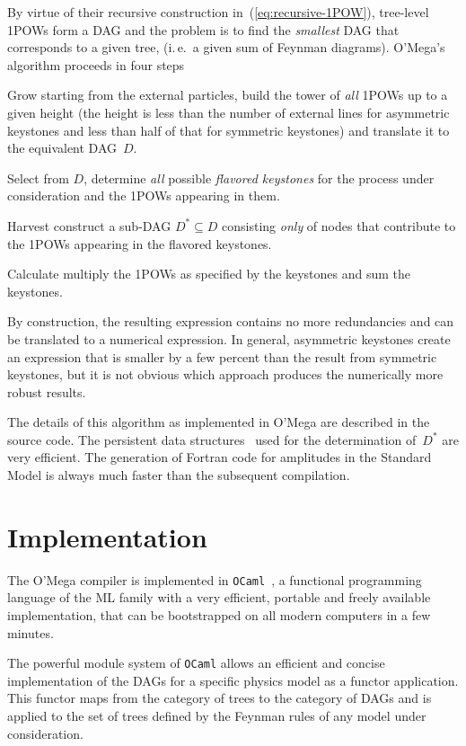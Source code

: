 \documentclass[12pt,a4paper]{article}
\newenvironment{algorithm}[1]%
 {\begin{list}{}%
   {\setlength{\leftmargin}{3em}%
    \setlength{\rightmargin}{3em}%
    \setlength{\itemindent}{1em}%
    \setlength{\listparindent}{0pt}%
    \settowidth{\labelwidth}{5em}%
    \renewcommand{\makelabel}[1]{\textbf{\hss##1:}}}}%
 {\end{list}}
\def\OCaml/{\texttt{OCaml}}
\begin{document}
By virtue of their recursive construction
in~(\ref{eq:recursive-1POW}), tree-level 1POWs form a DAG and the
problem is to find the \emph{smallest} DAG that corresponds to a given tree,
(i.\,e.~a given sum of Feynman diagrams).  O'Mega's algorithm
proceeds in four steps
\begin{algorithm}{Calculate}
  \item[Grow] starting from the external particles, build the tower of
    \emph{all} 1POWs up to a given height (the height
    is less than the number of external lines for asymmetric
    keystones and less than half of that for symmetric keystones)
    and translate it to the equivalent DAG~$D$.
  \item[Select] from $D$, determine \emph{all} possible
    \emph{flavored keystones} for the process under
    consideration and the 1POWs appearing in them.
  \item[Harvest] construct a sub-DAG $D^*\subseteq D$ consisting
    \emph{only} of nodes that contribute to the 1POWs
    appearing in the flavored keystones.
  \item[Calculate] multiply the 1POWs as specified by the keystones
    and sum the keystones.
\end{algorithm}
By construction, the resulting expression contains no more
redundancies and can be translated to a numerical expression.  In
general, asymmetric keystones create an expression that is smaller
by a few percent than the result from symmetric keystones, but it
is not obvious which approach produces the numerically more robust
results.

The details of this algorithm as implemented in O'Mega are described
in the source code.  The persistent data
structures~\cite{Okasaki:1998:book} used for the determination
of~$D^*$ are very efficient. The generation of Fortran
code for amplitudes in the Standard Model is always much faster than
the subsequent compilation.

\section{Implementation}
\label{sec:implementation}
The O'Mega compiler is implemented in \OCaml/~\cite{OCaml}, a
functional programming language of the ML family with a very
efficient, portable and freely available implementation, that can be
bootstrapped on all modern computers in a few minutes.

The powerful module system of \OCaml/ allows an efficient and concise
implementation of the DAGs for a specific physics model as a functor
application.  This functor maps from the category of
trees to the category of DAGs and is applied to the set of trees
defined by the Feynman rules of any model under consideration.
\end{document}
